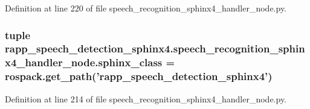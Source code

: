Definition at line 220 of file speech\-\_\-recognition\-\_\-sphinx4\-\_\-handler\-\_\-node.\-py.

\hypertarget{namespacerapp__speech__detection__sphinx4_1_1speech__recognition__sphinx4__handler__node_a6e5653796d4a0ce39db8711e77770610}{
\subsubsection[{sphinx\-\_\-class}]{\setlength{\rightskip}{0pt plus 5cm}tuple rapp\-\_\-speech\-\_\-detection\-\_\-sphinx4.\-speech\-\_\-recognition\-\_\-sphinx4\-\_\-handler\-\_\-node.\-sphinx\-\_\-class = rospack.\-get\-\_\-path('rapp\-\_\-speech\-\_\-detection\-\_\-sphinx4')}}\label{namespacerapp__speech__detection__sphinx4_1_1speech__recognition__sphinx4__handler__node_a6e5653796d4a0ce39db8711e77770610}


Definition at line 214 of file speech\-\_\-recognition\-\_\-sphinx4\-\_\-handler\-\_\-node.\-py.

